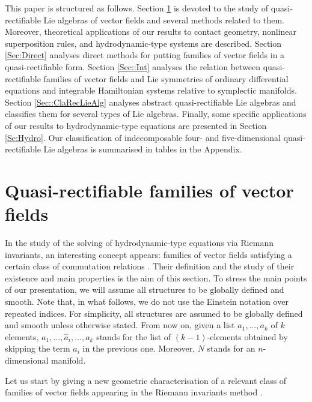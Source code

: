 \documentclass[12pt]{article}
\theoremstyle{plain}
\theoremstyle{definition}
\numberwithin{equation}{section}
\begin{document}
This paper is structured as follows. Section \ref{Sec:Elastic} is devoted to the study of quasi-rectifiable Lie algebras of vector fields and several methods related to them. Moreover, theoretical applications of our results to contact geometry, nonlinear superposition rules, and hydrodynamic-type systems are described. Section \ref{Sec:Direct} analyses direct methods for putting families of vector fields in a quasi-rectifiable form. Section \ref{Sec::Int} analyses the relation between quasi-rectifiable families of vector fields and Lie symmetries of ordinary differential equations and integrable Hamiltonian systems relative to symplectic manifolds. Section \ref{Sec::ClaRecLieAlg} analyses abstract quasi-rectifiable Lie algebras and classifies them for several types of Lie algebras. Finally, some specific applications of our results to hydrodynamic-type equations are presented in Section \ref{Se:Hydro}. Our classification of indecomposable four- and five-dimensional quasi-rectifiable Lie algebras is summarised in tables in the Appendix.


\section{Quasi-rectifiable families of vector fields}\label{Sec:Elastic}

In the study of the solving of hydrodynamic-type equations via Riemann invariants, an interesting concept appears: families of vector fields satisfying a certain class of commutation relations \cite{GL23,Ri58}. Their definition and the study of their existence and main properties is the aim of this section. To stress the main points of our presentation, we will assume all structures to be globally defined and smooth. %
Note that, in what follows, we do not use the Einstein notation over repeated indices. For simplicity, all structures are assumed to be globally defined and smooth unless otherwise stated. From now on, given a list $a_1,\ldots,a_k$ of $k$ elements, $a_1,\ldots,\widehat{a}_i,\ldots, a_k$ stands for the list of $(k-1)$-elements obtained by skipping the term $a_i$ in the previous one. Moreover, $N$ stands for an $n$-dimensional manifold.

Let us start by giving a new geometric characterisation of a relevant class of families of vector fields appearing in the Riemann invariants method \cite{GV91}.
\end{document}
